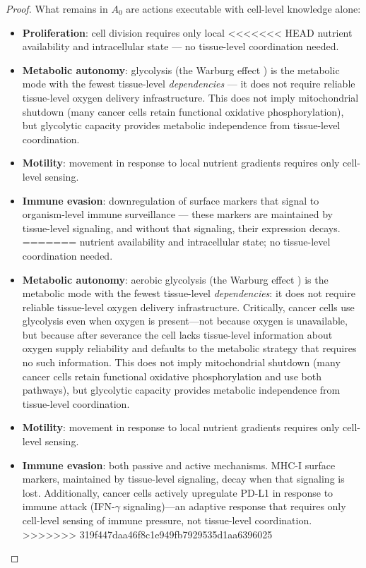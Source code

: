 \documentclass[11pt]{article}
\theoremstyle{definition}
\theoremstyle{remark}
\begin{document}
\begin{proof}
What remains in $A_0$ are actions executable with cell-level knowledge
alone:
\begin{itemize}
\item \textbf{Proliferation}: cell division requires only local
<<<<<<< HEAD
   nutrient availability and intracellular state --- no tissue-level
   coordination needed.
\item \textbf{Metabolic autonomy}: glycolysis (the Warburg effect
   \cite{Warburg1956}) is the metabolic mode with the fewest
   tissue-level \emph{dependencies} --- it does not require reliable
   tissue-level oxygen delivery infrastructure. This does not imply
   mitochondrial shutdown (many cancer cells retain functional
   oxidative phosphorylation), but glycolytic capacity provides
   metabolic independence from tissue-level coordination.
\item \textbf{Motility}: movement in response to local nutrient
   gradients requires only cell-level sensing.
\item \textbf{Immune evasion}: downregulation of surface markers
   that signal to organism-level immune surveillance --- these markers
   are maintained by tissue-level signaling, and without that
   signaling, their expression decays.
=======
   nutrient availability and intracellular state; no tissue-level
   coordination needed.
\item \textbf{Metabolic autonomy}: aerobic glycolysis (the Warburg
   effect \cite{Warburg1956}) is the metabolic mode with the fewest
   tissue-level \emph{dependencies}: it does not require reliable
   tissue-level oxygen delivery infrastructure. Critically, cancer
   cells use glycolysis even when oxygen is present---not because
   oxygen is unavailable, but because after severance the cell lacks
   tissue-level information about oxygen supply reliability and
   defaults to the metabolic strategy that requires no such
   information. This does not imply mitochondrial shutdown (many
   cancer cells retain functional oxidative phosphorylation and use
   both pathways), but glycolytic capacity provides metabolic
   independence from tissue-level coordination.
\item \textbf{Motility}: movement in response to local nutrient
   gradients requires only cell-level sensing.
\item \textbf{Immune evasion}: both passive and active mechanisms.
   MHC-I surface markers, maintained by tissue-level signaling, decay
   when that signaling is lost. Additionally, cancer cells actively
   upregulate PD-L1 in response to immune attack (IFN-$\gamma$
   signaling)---an adaptive response that requires only cell-level
   sensing of immune pressure, not tissue-level coordination.
>>>>>>> 319f447daa46f8c1e949fb7929535d1aa6396025
\end{itemize}


\end{proof}
\end{document}
